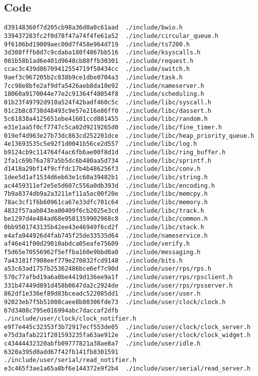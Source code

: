 \documentclass{article}
\begin{document}
\subsection{Code}
\begin{verbatim}
d39148360f7d205cb98a36d0a0c61aad  ./include/bwio.h
339437283fc2f0d78f47a74f4fe61a52  ./include/circular_queue.h
9f6106bd19009aec00d7f458e964d719  ./include/ts7200.h
3d308fffb8d7c9cdaba180f4867bb516  ./include/ksyscalls.h
081b58b1ad6e401d9648cb88ffb30301  ./include/request.h
ccac3c439d86709412554719f50434cc  ./include/switch.h
9aef3c967205b2c838b9ce1dbe0704a3  ./include/task.h
7cc98e8bfe2af9dfa5426aeb8da10e92  ./include/nameserver.h
18060a9170044e77e2c91364f48054f8  ./include/scheduling.h
01b23f49792d910a524f42badf460c5c  ./include/libc/syscall.h
01c2b8c8738d48493c9e57e216e86ff0  ./include/libc/dassert.h
5c61838a4125651ebe41601ccd881455  ./include/libc/random.h
e31e1aa5f0cf7747c5ca02d9219265d0  ./include/libc/fine_timer.h
019ef4d963e27b73dc863cd252201dce  ./include/libc/heap_priority_queue.h
4e13693535c5e92f1d0041b56ce2d557  ./include/libc/log.h
b9124cb9c114764f4ac6fb6ae00f8d1d  ./include/libc/ring_buffer.h
2fa1c69b76a787a5b5dc6b480aa5d734  ./include/libc/sprintf.h
d1418a29bf14f9cffdc17b4b486256f3  ./include/libc/conv.h
1dee5d1af1534d6eb63e1c60a39482b1  ./include/libc/string.h
ac4459311ef2e5e5d607c556a0db393d  ./include/libc/encoding.h
7b9a8374db9a2a3211ef11a5ac00f20e  ./include/libc/memcpy.h
78ac3cf1f6b60961ca67e33dfc701c64  ./include/libc/memory.h
4832f57aab043ea00409f6cb2025e3cd  ./include/libc/track.h
be1297d4e484ad68e9581359902968c8  ./include/libc/common.h
0bb9501743135b42ee43e46949f6cd2f  ./include/libc/stack.h
e4afa944926d4fab745f25de33535d64  ./include/nameservice.h
af46e41f00d29010abdca05eafe75609  ./include/verify.h
f5d65e70556962f5effba160e9bbd0a0  ./include/messaging.h
7a43181f7908eef779e270832fcd9148  ./include/bits.h
a53c63ad1757b25362486bce6ef7c90d  ./include/user/rps/rps.h
570c77afbd19a6a0be4419d136ee9a1f  ./include/user/rps/rpsclient.h
331b47449d891d458b0647da2c2924de  ./include/user/rps/rpsserver.h
862df1e336ef89d83bceadc522085dd1  ./include/user/user.h
92023eb7f5b51008caee8b80306fde73  ./include/user/clock/clock.h
67d3408c795e016994abc7daccaf2dfb  ./include/user/clock/clock_notifier.h
e9f7e445c32353f3b72917ecf553de05  ./include/user/clock/clock_server.h
e75d3afab221f201593235fa63ae912e  ./include/user/clock/clock_widget.h
c43444432320abfb09777821a38ae8a7  ./include/user/idle.h
6320a395d0add67f42fb141fb8301591  ./include/user/serial/read_notifier.h
e3c465f3ae1a65a8bf6e144372e9f2b4  ./include/user/serial/read_server.h

\end{verbatim}
\end{document}
